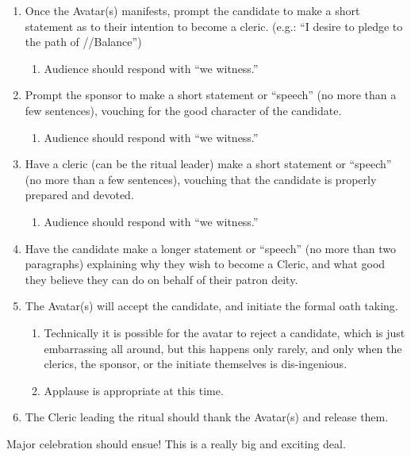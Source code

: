\documentclass[green]{GL2020}
\begin{document}
\begin{enumerate}
    \item Once the Avatar(s) manifests, prompt the candidate to make a short statement as to their intention to become a cleric. (e.g.: ``I desire to pledge to the path of \cEbb{}/\cFlow{}/Balance'')
    \begin{enumerate}
      \item Audience should respond with ``we witness.''
    \end{enumerate}
    \item Prompt the sponsor to make a short statement or ``speech'' (no more than a few sentences), vouching for the good character of the candidate.
    \begin{enumerate}
      \item Audience should respond with ``we witness.''
    \end{enumerate}
    \item Have a cleric (can be the ritual leader) make a short statement or ``speech'' (no more than a few sentences), vouching that the candidate is properly prepared and devoted.
    \begin{enumerate}
      \item Audience should respond with ``we witness.''
    \end{enumerate}
    \item Have the candidate make a longer statement or ``speech'' (no more than two paragraphs) explaining why they wish to become a Cleric, and what good they believe they can do on behalf of their patron deity.
    \item The Avatar(s) will accept the candidate, and initiate the formal oath taking.
    \begin{enumerate}
      \item Technically it is possible for the avatar to reject a candidate, which is just embarrassing all around, but this happens only rarely, and only when the clerics, the sponsor, or the initiate themselves is dis-ingenious.
      \item Applause is appropriate at this time.
    \end{enumerate}
    \item The Cleric leading the ritual should thank the Avatar(s) and release them.
  \end{enumerate}
Major celebration should ensue! This is a really big and exciting deal.
\end{document}
